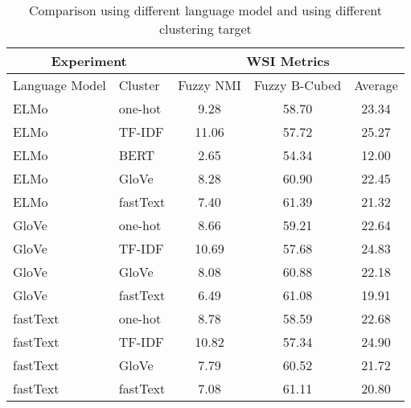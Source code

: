 \begin{table}[htbp!]
    \centering
    \begin{tabular}{llccc}
    \toprule
        \multicolumn{2}{c}{Experiment}   & \multicolumn{3}{c}{WSI Metrics}           \\
    \midrule
        Language Model     & Cluster     & Fuzzy NMI     & Fuzzy B-Cubed  & Average  \\
    \midrule
        ELMo               & one-hot     & 9.28          & 58.70          & 23.34    \\
        ELMo               & TF-IDF      & 11.06         & 57.72          & 25.27    \\
        ELMo               & BERT        & 2.65          & 54.34          & 12.00    \\
        ELMo               & GloVe       & 8.28          & 60.90          & 22.45    \\
        ELMo               & fastText    & 7.40          & 61.39          & 21.32    \\
        GloVe              & one-hot     & 8.66          & 59.21          & 22.64    \\
        GloVe              & TF-IDF      & 10.69         & 57.68          & 24.83    \\
        GloVe              & GloVe       & 8.08          & 60.88          & 22.18    \\
        GloVe              & fastText    & 6.49          & 61.08          & 19.91    \\
        fastText           & one-hot     & 8.78          & 58.59          & 22.68    \\
        fastText           & TF-IDF      & 10.82         & 57.34          & 24.90    \\
        fastText           & GloVe       & 7.79          & 60.52          & 21.72    \\
        fastText           & fastText    & 7.08          & 61.11          & 20.80    \\
    \bottomrule
    \end{tabular}
\caption{Comparison using different language model and using different clustering target}
\label{tab:bilm_result}
\end{table} 